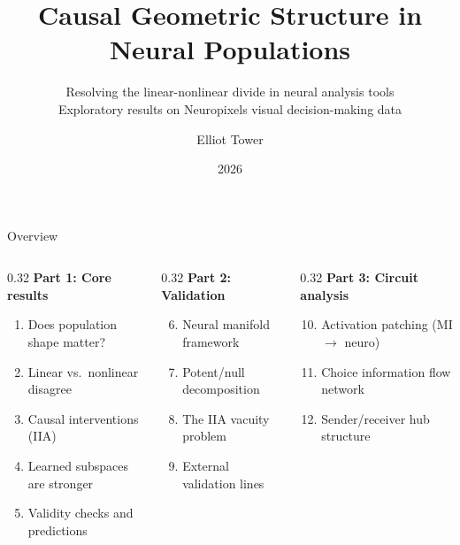 \documentclass[aspectratio=169,11pt]{beamer}
\title{Causal Geometric Structure in Neural Populations}
\subtitle{Resolving the linear-nonlinear divide in neural analysis tools\\[0.3em]
{\small Exploratory results on Neuropixels visual decision-making data}}
\author{Elliot Tower}
\date{2026}
\institute{}
\begin{document}
\maketitle

\begin{frame}{Overview}

\begin{columns}[T]
\begin{column}{0.32\textwidth}
\textbf{Part 1: Core results}
\begin{enumerate}
  \item Does population shape matter?
  \item Linear vs.\ nonlinear disagree
  \item Causal interventions (IIA)
  \item Learned subspaces are stronger
  \item Validity checks and predictions
\end{enumerate}
\end{column}
\begin{column}{0.32\textwidth}
\textbf{Part 2: Validation}
\begin{enumerate}
  \setcounter{enumi}{5}
  \item Neural manifold framework
  \item Potent/null decomposition
  \item The IIA vacuity problem
  \item External validation lines
\end{enumerate}
\end{column}
\begin{column}{0.32\textwidth}
\textbf{Part 3: Circuit analysis}
\begin{enumerate}
  \setcounter{enumi}{9}
  \item Activation patching (MI $\to$ neuro)
  \item Choice information flow network
  \item Sender/receiver hub structure
\end{enumerate}
\end{column}
\end{columns}
\end{frame}


\begin{frame}[plain]
\vfill
\begin{center}
  \setlength{\fboxrule}{2.5pt}%
\end{center}
\vfill
\end{frame}
\end{document}
